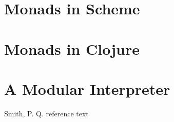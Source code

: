 \documentclass[preprint,natbib,10pt]{sigplanconf}
\begin{document}
\section{Monads in Scheme}

\section{Monads in Clojure}

\section{A Modular Interpreter}







\begin{thebibliography}{}

Smith, P. Q. reference text

\end{thebibliography}
\end{document}
